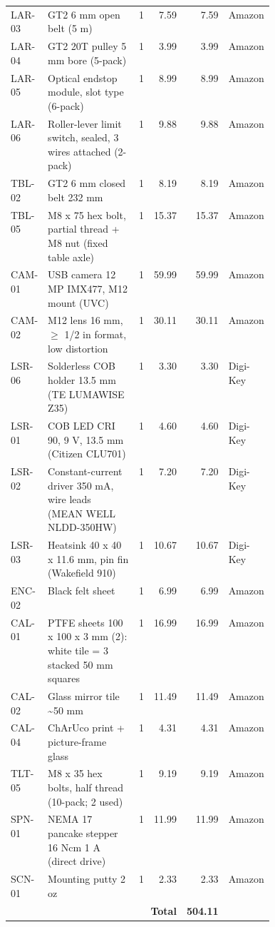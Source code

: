 {\begin{longtable}{|l|p{0.43\linewidth}|r|r|r|l|}
LAR-03 & GT2 6 mm open belt (5 m) & 1 & 7.59 & 7.59 & Amazon \\
LAR-04 & GT2 20T pulley 5 mm bore (5-pack) & 1 & 3.99 & 3.99 & Amazon \\
LAR-05 & Optical endstop module, slot type (6-pack) & 1 & 8.99 & 8.99 & Amazon \\
LAR-06 & Roller-lever limit switch, sealed, 3 wires attached (2-pack) & 1 & 9.88 & 9.88 & Amazon \\
TBL-02 & GT2 6 mm closed belt 232 mm & 1 & 8.19 & 8.19 & Amazon \\
TBL-05 & M8 x 75 hex bolt, partial thread + M8 nut (fixed table axle) & 1 & 15.37 & 15.37 & Amazon \\
CAM-01 & USB camera 12 MP IMX477, M12 mount (UVC) & 1 & 59.99 & 59.99 & Amazon \\
CAM-02 & M12 lens 16 mm, $\geq$ 1/2 in format, low distortion & 1 & 30.11 & 30.11 & Amazon \\
LSR-06 & Solderless COB holder 13.5 mm (TE LUMAWISE Z35) & 1 & 3.30 & 3.30 & Digi-Key \\
LSR-01 & COB LED CRI 90, 9 V, 13.5 mm (Citizen CLU701) & 1 & 4.60 & 4.60 & Digi-Key \\
LSR-02 & Constant-current driver 350 mA, wire leads (MEAN WELL NLDD-350HW) & 1 & 7.20 & 7.20 & Digi-Key \\
LSR-03 & Heatsink 40 x 40 x 11.6 mm, pin fin (Wakefield 910) & 1 & 10.67 & 10.67 & Digi-Key \\
ENC-02 & Black felt sheet & 1 & 6.99 & 6.99 & Amazon \\
CAL-01 & PTFE sheets 100 x 100 x 3 mm (2): white tile = 3 stacked 50 mm squares & 1 & 16.99 & 16.99 & Amazon \\
CAL-02 & Glass mirror tile \textasciitilde{}50 mm & 1 & 11.49 & 11.49 & Amazon \\
CAL-04 & ChArUco print + picture-frame glass & 1 & 4.31 & 4.31 & Amazon \\
TLT-05 & M8 x 35 hex bolts, half thread (10-pack; 2 used) & 1 & 9.19 & 9.19 & Amazon \\
SPN-01 & NEMA 17 pancake stepper 16 Ncm 1 A (direct drive) & 1 & 11.99 & 11.99 & Amazon \\
SCN-01 & Mounting putty 2 oz & 1 & 2.33 & 2.33 & Amazon \\
\hline\multicolumn{4}{|r|}{\textbf{Total}} & \textbf{504.11} & \multicolumn{1}{l|}{} \\ \hline
\end{longtable}}
